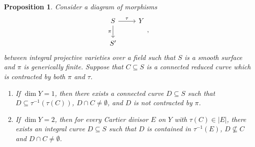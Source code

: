 \documentclass[11pt, letterpaper]{amsart}
\theoremstyle{plain}
\newtheorem{proposition}[theorem]{Proposition}
\theoremstyle{definition}
\newcommand{\<}{\langle}
\renewcommand{\>}{\rangle}
\begin{document}
\begin{proposition}
\label{prop: apply Hodge index}
    Consider a diagram of morphisms
    \[\begin{tikzcd}
	S & Y \\
	S'
	\arrow["\pi"', from=1-1, to=2-1]
	\arrow["\tau", from=1-1, to=1-2]
    \end{tikzcd},\]
    between integral projective varieties over a field such that $S$ is a smooth surface and $\pi$ is generically finite. Suppose that $C \subseteq S$ is a connected reduced curve which is contracted by both $\pi$ and $\tau$. 
    \begin{enumerate}[label=\upshape{(\alph*)}]
        \item If $\dim Y = 1$, then there exists a connected curve $D \subseteq S$ such that $D \subseteq \tau^{-1}(\tau(C))$, $D \cap C \neq \emptyset$, and $D$ is not contracted by $\pi$. 
        \item If $\dim Y = 2$, then for every Cartier divisor $E$ on $Y$ with $\tau(C) \in |E|$, there exists an integral curve $D \subseteq S$ such that $D$ is contained in $\tau^{-1}(E)$, $D \nsubseteq C$ and $D \cap C \neq \emptyset$. 
    \end{enumerate}
\end{proposition}
\end{document}
